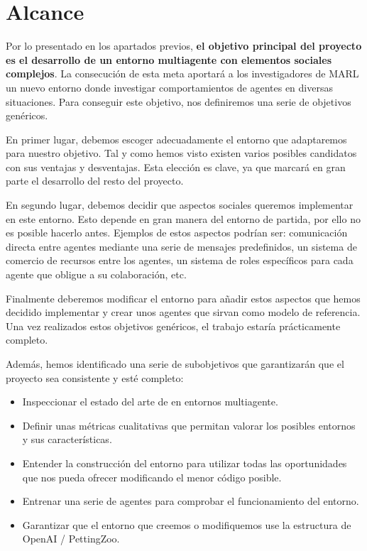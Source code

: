 \chapter{Alcance}
Por lo presentado en los apartados previos, \textbf{el objetivo principal del proyecto es el desarrollo de un entorno multiagente con elementos sociales complejos}. La consecución de esta meta aportará a los investigadores de MARL un nuevo entorno donde investigar comportamientos de agentes en diversas situaciones. Para conseguir este objetivo, nos definiremos una serie de objetivos genéricos.

En primer lugar, debemos escoger adecuadamente el entorno que adaptaremos para nuestro objetivo. Tal y como hemos visto existen varios posibles candidatos con sus ventajas y desventajas. Esta elección es clave, ya que marcará en gran parte el desarrollo del resto del proyecto. 

En segundo lugar, debemos decidir que aspectos sociales queremos implementar en este entorno. Esto depende en gran manera del entorno de partida, por ello no es posible hacerlo antes. Ejemplos de estos aspectos podrían ser: comunicación directa entre agentes mediante una serie de mensajes predefinidos, un sistema de comercio de recursos entre los agentes, un sistema de roles específicos para cada agente que obligue a su colaboración, etc. 

Finalmente deberemos modificar el entorno para añadir estos aspectos que hemos decidido implementar y crear unos agentes que sirvan como modelo de referencia. Una vez realizados estos objetivos genéricos, el trabajo estaría prácticamente completo. 

Además, hemos identificado una serie de subobjetivos que garantizarán que el proyecto sea consistente y esté completo:

\begin{itemize}
    \item Inspeccionar el estado del arte de en entornos multiagente. 
    \item Definir unas métricas cualitativas que permitan valorar los posibles entornos y sus características.
    \item Entender la construcción del entorno para utilizar todas las oportunidades que nos pueda ofrecer modificando el menor código posible.
    \item Entrenar una serie de agentes para comprobar el funcionamiento del entorno. 
    \item Garantizar que el entorno que creemos o modifiquemos use la estructura de OpenAI / PettingZoo.
\end{itemize}
 
